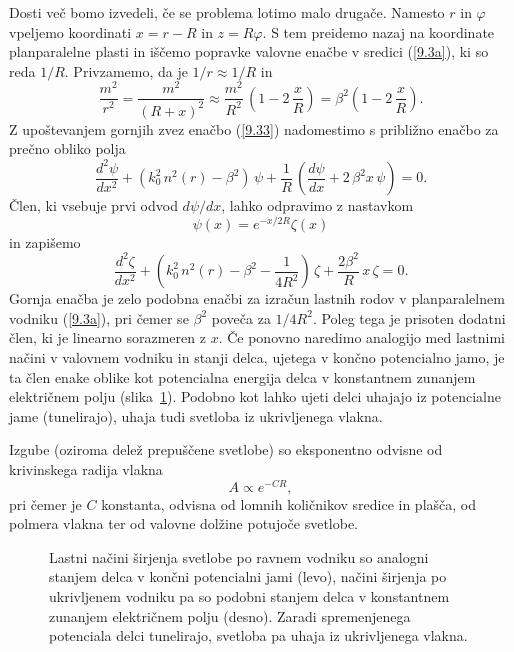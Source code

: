 Dosti več bomo izvedeli, če se problema lotimo malo drugače. Namesto $r$
in $\varphi$ vpeljemo koordinati $x=r-R$ in $z=R\varphi$.
S tem preidemo nazaj na koordinate planparalelne plasti in iščemo popravke valovne
enačbe v sredici (\ref{9.3a}), ki so reda $1/R.$ Privzamemo, da je $1/r\approx1/R$ in 
\begin{equation}
\frac{m^{2}}{r^{2}}=\frac{m^{2}}{\left(R+x\right)^{2}}\approx\frac{m^{2}}
{R^{2}}\,\left(1-2\,\frac{x}{R}\right)=\beta^{2}\left(1-2\,\frac{x}{R}\right).
\label{9.34}
\end{equation}
Z upoštevanjem gornjih zvez enačbo (\ref{9.33}) nadomestimo s približno enačbo za prečno obliko
polja 
\begin{equation}
\frac{d^{2}\psi}{dx^{2}}+\left(k_{0}^{2}\, n^{2}\left(r\right)-\beta^{2}\right)\,\psi+\frac{1}{R}\,
\left(\frac{d\psi}{dx}+2\,\beta^{2}x\,\psi\right)=0.
\label{9.35}
\end{equation}
Člen, ki vsebuje prvi odvod $d \psi/d x$, lahko odpravimo z nastavkom 
\begin{equation}
\psi(x) = e^{-x/2R} \zeta(x)
\end{equation}
in zapišemo
\begin{equation}
\frac{d^{2}\zeta}{dx^{2}}+\left(k_{0}^{2}\, n^{2}\left(r\right)-\beta^{2}-\frac{1}{4R^2}\right)\,\zeta
+ \frac{2\beta^{2}}{R}\,x\,\zeta=0.
\label{9.35}
\end{equation}
Gornja enačba je zelo podobna enačbi za izračun lastnih rodov v planparalelnem
vodniku (\ref{9.3a}), pri čemer se $\beta^2$ poveča za $1/4R^2$. Poleg tega je prisoten
dodatni člen, ki je linearno sorazmeren z $x$. Če ponovno naredimo analogijo
med lastnimi načini v valovnem vodniku in stanji delca, ujetega v končno potencialno jamo, 
je ta člen enake oblike kot potencialna energija delca v konstantnem zunanjem električnem 
polju (slika~\ref{fig:tunel}). Podobno kot lahko ujeti delci uhajajo iz potencialne jame
(tunelirajo), uhaja tudi svetloba iz ukrivljenega vlakna.

Izgube (oziroma delež prepuščene 
svetlobe) so eksponentno odvisne od krivinskega radija vlakna 
\begin{equation}
A \propto e^{-CR},
\end{equation}
pri čemer je $C$ konstanta, odvisna od lomnih količnikov sredice in plašča, od polmera vlakna 
ter od valovne dolžine potujoče svetlobe.
\begin{figure}[h]
\centering
\def\svgwidth{120truemm} 
 
\caption{Lastni načini širjenja svetlobe po ravnem vodniku so analogni stanjem 
delca v končni potencialni jami (levo), načini širjenja po ukrivljenem vodniku pa 
so podobni stanjem delca v konstantnem zunanjem električnem polju (desno). Zaradi
spremenjenega potenciala delci tunelirajo, svetloba pa uhaja iz ukrivljenega vlakna.}
\label{fig:tunel}
\end{figure}

